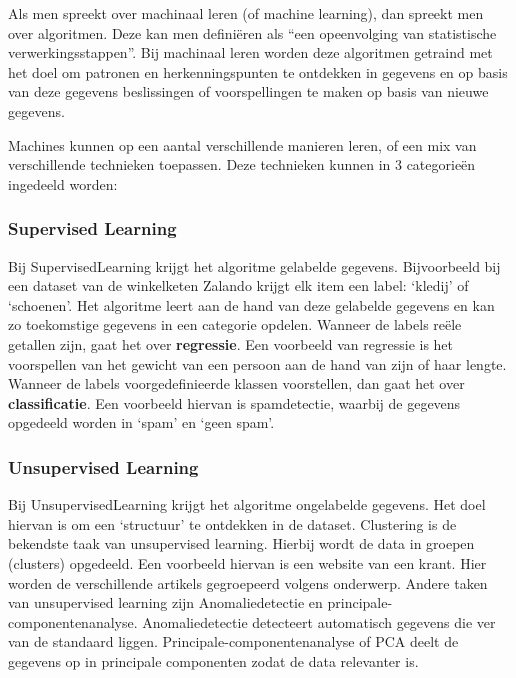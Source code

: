Als men spreekt over machinaal leren (of machine learning), dan spreekt men over algoritmen. Deze kan men definiëren als “een opeenvolging van statistische verwerkingsstappen”. Bij machinaal leren worden deze algoritmen getraind met het doel om patronen en herkenningspunten te ontdekken in gegevens en op basis van deze gegevens beslissingen of voorspellingen te maken op basis van nieuwe gegevens. \autocite{IBM2020a}

Machines kunnen op een aantal verschillende manieren leren, of een mix van verschillende technieken toepassen. Deze technieken kunnen in 3 categorieën ingedeeld worden:

\subsubsection{Supervised Learning}
\label{sec:supervisedlearning}
Bij \gls{SupervisedLearning} krijgt het algoritme gelabelde gegevens. Bijvoorbeeld bij een dataset van de winkelketen Zalando krijgt elk item een label: ‘kledij’ of ‘schoenen’. Het algoritme leert aan de hand van deze gelabelde gegevens en kan zo toekomstige gegevens in een categorie opdelen. Wanneer de labels reële getallen zijn, gaat het over \textbf{regressie}. Een voorbeeld van regressie is het voorspellen van het gewicht van een persoon aan de hand van zijn of haar lengte. Wanneer de labels voorgedefinieerde klassen voorstellen, dan gaat het over \textbf{classificatie}. Een voorbeeld hiervan is spamdetectie, waarbij de gegevens opgedeeld worden in ‘spam’ en ‘geen spam’.\autocite{Lievens2020} 

\subsubsection{Unsupervised Learning}
\label{sec:unsupervisedlearning}
Bij \gls{UnsupervisedLearning} krijgt het algoritme ongelabelde gegevens. Het doel hiervan is om een ‘structuur’ te ontdekken in de dataset. Clustering is de bekendste taak van unsupervised learning. Hierbij wordt de data in groepen (clusters) opgedeeld. Een voorbeeld hiervan is een website van een krant. Hier worden de verschillende artikels gegroepeerd volgens onderwerp. \autocite{Lievens2020}
Andere taken van unsupervised learning zijn Anomaliedetectie en principale-componentenanalyse. Anomaliedetectie detecteert automatisch gegevens die ver van de standaard liggen. Principale-componentenanalyse of PCA deelt de gegevens op in principale componenten zodat de data relevanter is. 

